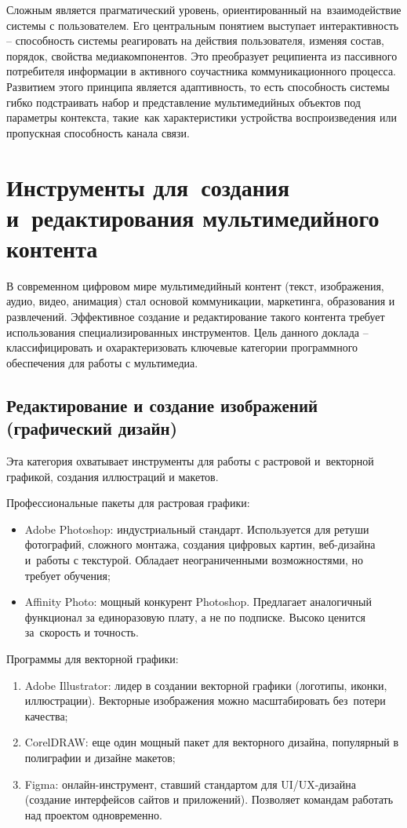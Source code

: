 \documentclass{ou}
\begin{document}
Сложным является прагматический уровень, ориентированный на~взаимодействие системы с пользователем. Его центральным понятием выступает интерактивность -- способность системы реагировать на действия пользователя, изменяя состав, порядок, свойства медиакомпонентов. Это преобразует реципиента из пассивного потребителя информации в активного соучастника коммуникационного процесса. Развитием этого принципа является адаптивность, то есть способность системы гибко подстраивать набор и представление мультимедийных объектов под параметры контекста, такие~как характеристики устройства воспроизведения или пропускная способность канала связи\cite{Panasenko_2022}.
\newpage
\section{Инструменты для~создания и~редактирования мультимедийного контента}
В современном цифровом мире мультимедийный контент (текст, изображения, аудио, видео, анимация) стал основой коммуникации, маркетинга, образования и развлечений. Эффективное создание и редактирование такого контента требует использования специализированных инструментов. Цель данного доклада -- классифицировать и охарактеризовать ключевые категории программного обеспечения для работы с мультимедиа.
\subsection{Редактирование и создание изображений (графический дизайн)}
Эта категория охватывает инструменты для работы с растровой и~векторной графикой, создания иллюстраций и макетов.

Профессиональные пакеты для растровая графики:
\begin{itemize}[label=-, leftmargin=0em, itemindent=3.35em, nosep]
\item Adobe Photoshop: индустриальный стандарт. Используется для ретуши фотографий, сложного монтажа, создания цифровых картин, веб-дизайна и~работы с текстурой. Обладает неограниченными возможностями, но требует обучения;
\item Affinity Photo: мощный конкурент Photoshop. Предлагает аналогичный функционал за единоразовую плату, а не по подписке. Высоко ценится за~скорость и точность.
\end{itemize}

Программы для векторной графики:
\begin{enumerate}[leftmargin=0em, itemindent=3.75em, nosep, label=\arabic*)]
\item Adobe Illustrator: лидер в создании векторной графики (логотипы, иконки, иллюстрации). Векторные изображения можно масштабировать без~потери качества;
\item CorelDRAW: еще один мощный пакет для векторного дизайна, популярный в полиграфии и дизайне макетов;
\item Figma: онлайн-инструмент, ставший стандартом для UI/UX-дизайна (создание интерфейсов сайтов и приложений). Позволяет командам работать над проектом одновременно.
\end{enumerate}
\end{document}
